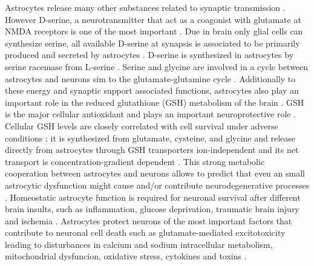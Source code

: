Astrocytes release many other substances related to synaptic transmission \cite{Petrelli2016}. However D-serine, a neurotransmitter that act as a coagonist with glutamate at NMDA receptors is one of the most important \cite{Halassa2010}. Due in brain only glial cells can synthesize serine, all available D-serine at synapsis is associated to be primarily produced and secreted by astrocytes \cite{Barres2008}. D-serine is synthesized in astrocytes by serine racemase from L-serine \cite{Durrant2014}. Serine and glycine are involved in a cycle between astrocytes and neurons sim to the glutamate-glutamine cycle \cite{Cakir2007}. Additionally to these energy and synaptic support associated functions, astrocytes also play an important role in the reduced glutathione (GSH) metabolism of the brain \cite{Raps1989}. GSH is the major cellular antioxidant and plays an important neuroprotective role \cite{Jha2016}. Cellular GSH levels are closely correlated with cell survival under adverse conditions \cite{Allaman2011}; it is synthesized from glutamate, cysteine, and glycine and release directly from astrocytes through GSH transporters ion-independent and its net transport is concentration-gradient dependent \cite{Wang2000}. 
This strong metabolic cooperation between astrocytes and neurons allows to predict that even an small astrocytic dysfunction might cause and/or contribute neurodegenerative processes \cite{Maragakis2006}. Homeostatic astrocyte function is required for neuronal survival after different brain insults, such as inflammation, glucose deprivation, traumatic brain injury and ischemia \cite{Avila-Rodriguez2014,Jha2016}. Astrocytes protect neurons of the most important factors that contribute to neuronal cell death such as glutamate-mediated excitotoxicity leading to disturbances in calcium and sodium intracellular metabolism, mitochondrial dysfuncion, oxidative stress, cytokines and toxins \cite{Takuma2004,Lange2012,Nijboer2013,Hussain2013}.

